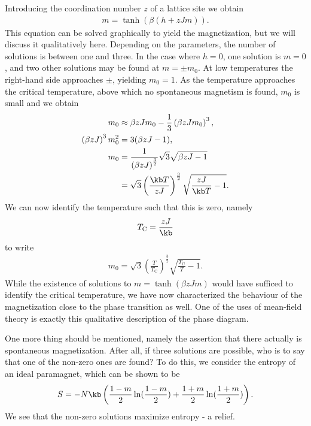 Introducing the coordination number $z$ of a lattice site we obtain
\begin{align*}
m = \tanh(\beta\left(h + zJm\right)).
\end{align*}
This equation can be solved graphically to yield the magnetization, but we will discuss it qualitatively here. Depending on the parameters, the number of solutions is between one and three. In the case where $h = 0$, one solution is $m = 0$, and two other solutions may be found at $m = \pm m_{0}$. At low temperatures the right-hand side approaches $\pm$, yielding $m_{0} = 1$. As the temperature approaches the critical temperature, above which no spontaneous magnetism is found, $m_{0}$ is small and we obtain
\begin{align*}
m_{0}                              &\approx \beta zJm_{0} - \frac{1}{3}\left(\beta zJm_{0}\right)^{3}, \\
\left(\beta zJ\right)^{3}m_{0}^{2} &= 3(\beta zJ - 1), \\
m_{0}                              &= \frac{1}{\left(\beta zJ\right)^{\frac{3}{2}}}\sqrt{3}\sqrt{\beta zJ - 1} \\
&= \sqrt{3}\left(\frac{\kb T}{zJ}\right)^{\frac{3}{2}}\sqrt{\frac{zJ}{\kb T} - 1}.
\end{align*}
We can now identify the temperature such that this is zero, namely
\begin{align*}
T_{\text{C}} = \frac{zJ}{\kb}
\end{align*}
to write
\begin{align*}
m_{0} = \sqrt{3}\left(\frac{T}{T_{\text{C}}}\right)^{\frac{3}{2}}\sqrt{\frac{T_{\text{C}}}{T} - 1}.
\end{align*}
While the existence of solutions to $m = \tanh(\beta zJm)$ would have sufficed to identify the critical temperature, we have now characterized the behaviour of the magnetization close to the phase transition as well. One of the uses of mean-field theory is exactly this qualitative description of the phase diagram.

One more thing should be mentioned, namely the assertion that there actually is spontaneous magnetization. After all, if three solutions are possible, who is to say that one of the non-zero ones are found? To do this, we consider the entropy of an ideal paramagnet, which can be shown to be
\begin{align*}
S = -N\kb\left(\frac{1 - m}{2}\ln(\frac{1 - m}{2}) + \frac{1 + m}{2}\ln(\frac{1 + m}{2})\right).
\end{align*}
We see that the non-zero solutions maximize entropy - a relief.
